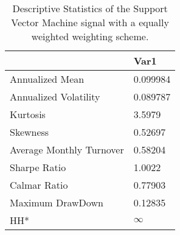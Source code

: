 \begin{table}[H]
\centering
\begin{tabular}{ll}
& Var1 \\ 
\hline 
Annualized Mean & 0.099984 \\ 
Annualized Volatility & 0.089787 \\ 
Kurtosis & 3.5979 \\ 
Skewness & 0.52697 \\ 
Average Monthly Turnover & 0.58204 \\ 
Sharpe Ratio & 1.0022 \\ 
Calmar Ratio & 0.77903 \\ 
Maximum DrawDown & 0.12835 \\ 
HH* & $\infty$ \\ 
\hline
\end{tabular}
\caption{Descriptive Statistics of the Support Vector Machine signal with a equally weighted weighting scheme.}
\label{SVM_MODEL_EW}
\end{table}